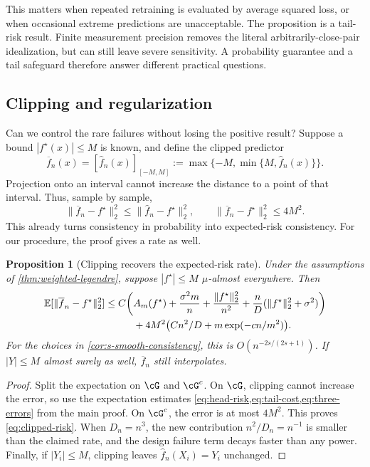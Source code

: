 \documentclass[11pt,twoside]{article}
\newcommand{\E}{\mathbb E}
\newtheorem{proposition}[theorem]{Proposition}
\theoremstyle{definition}
\theoremstyle{remark}
\begin{document}
This matters when repeated retraining is evaluated by average squared loss,
or when occasional extreme predictions are unacceptable. The proposition is
a tail-risk result.
Finite measurement precision
removes the literal arbitrarily-close-pair idealization, but can still leave
severe sensitivity. A probability guarantee and a tail safeguard therefore
answer different practical questions.

\subsection{Clipping and regularization}

Can we control the rare failures without losing the positive result?
Suppose a bound $|f^\star(x)|\le M$ is known, and define the clipped predictor
\[
 \overline f_n(x)=[\widehat f_n(x)]_{[-M,M]}
 :=\max\{-M,\min\{M,\widehat f_n(x)\}\}.
\]
Projection onto an interval cannot increase the distance to a point of that
interval. Thus, sample by sample,
\[
 \|\overline f_n-f^\star\|_2^2
 \le\|\widehat f_n-f^\star\|_2^2,\qquad
 \|\overline f_n-f^\star\|_2^2\le4M^2.
\]
This already turns consistency in probability into expected-risk consistency.
For our procedure, the proof gives a rate as well.

\begin{proposition}[Clipping recovers the expected-risk rate]
\label{prop:clipped-rate}
Under the assumptions of \cref{thm:weighted-legendre}, suppose
$|f^\star|\le M$ $\mu$-almost everywhere. Then
\begin{align}
 \E[\|\overline f_n-f^\star\|_2^2]
 \le C\bigg(&A_m(f^\star)+\frac{\sigma^2m}{n}
       +\frac{\|f^\star\|_2^2}{n^2}
       +\frac nD(\|f^\star\|_2^2+\sigma^2)\bigg)\notag\\
       &+4M^2\bigl(Cn^2/D+m\exp(-cn/m^2)\bigr).
 \label{eq:clipped-risk}
\end{align}
For the choices in \cref{cor:s-smooth-consistency}, this is
$O(n^{-2s/(2s+1)})$.
If $|Y|\le M$ almost surely as well, $\overline f_n$ still interpolates.
\end{proposition}

\begin{proof}
Split the expectation on $\cG$ and $\cG^c$. On $\cG$, clipping cannot
increase the error, so use the expectation estimates
\cref{eq:head-risk,eq:tail-cost,eq:three-errors} from the main proof.
On $\cG^c$, the error is at most $4M^2$. This proves
\cref{eq:clipped-risk}.
When $D_n=n^3$, the new contribution $n^2/D_n=n^{-1}$ is smaller than the
claimed rate, and the design failure term decays faster than any power.
Finally, if $|Y_i|\le M$, clipping leaves
$\widehat f_n(X_i)=Y_i$ unchanged.
\end{proof}
\end{document}
